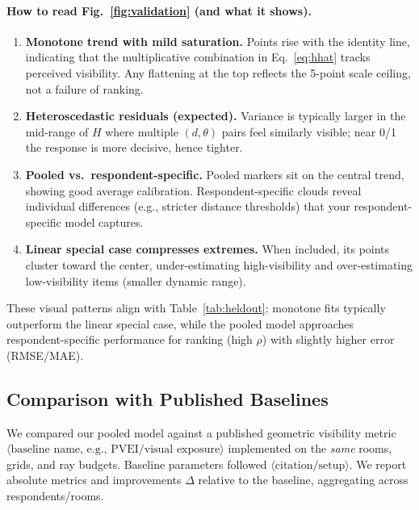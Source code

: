 \documentclass[final,3p,times,review]{elsarticle}
\begin{document}
\paragraph{How to read Fig.~\ref{fig:validation} (and what it shows).}
\begin{enumerate}
  \item \textbf{Monotone trend with mild saturation.} Points rise with the identity line, indicating that the multiplicative combination in Eq.~\eqref{eq:hhat} tracks perceived visibility. Any flattening at the top reflects the 5-point scale ceiling, not a failure of ranking.
  \item \textbf{Heteroscedastic residuals (expected).} Variance is typically larger in the mid-range of $H$ where multiple $(d,\theta)$ pairs feel similarly visible; near 0/1 the response is more decisive, hence tighter.
  \item \textbf{Pooled vs.\ respondent-specific.} Pooled markers sit on the central trend, showing good average calibration. Respondent-specific clouds reveal individual differences (e.g., stricter distance thresholds) that your respondent-specific model captures.
  \item \textbf{Linear special case compresses extremes.} When included, its points cluster toward the center, under-estimating high-visibility and over-estimating low-visibility items (smaller dynamic range).
\end{enumerate}
These visual patterns align with Table~\ref{tab:heldout}: monotone fits typically outperform the linear special case, while the pooled model approaches respondent-specific performance for ranking (high $\rho$) with slightly higher error (RMSE/MAE).

\subsection{Comparison with Published Baselines}
We compared our pooled model against a published geometric visibility metric $\langle \text{baseline name, e.g., PVEI/visual exposure} \rangle$ implemented on the \emph{same} rooms, grids, and ray budgets. Baseline parameters followed $\langle \text{citation/setup} \rangle$. We report absolute metrics and improvements $\Delta$ relative to the baseline, aggregating across respondents/rooms.
\end{document}
